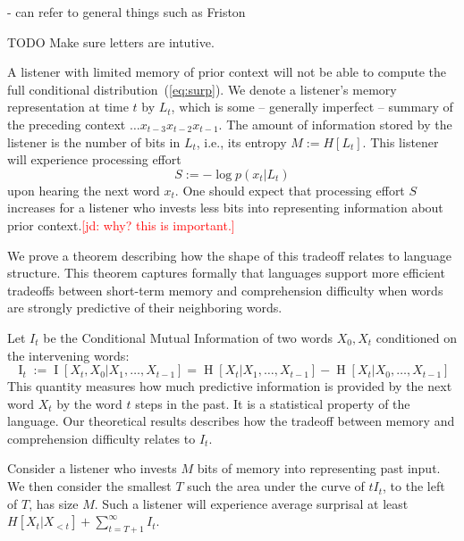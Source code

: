 \documentclass[11pt,letterpaper]{article}
\newcounter{theorem}
\newcommand{\jd}[1]{\textcolor{Red}{[jd: #1]}}
\begin{document}
- can refer to general things such as Friston


TODO Make sure letters are intutive.

A listener with limited memory of prior context will not be able to compute the full conditional distribution~(\ref{eq:surp}).
We denote a listener's memory representation at time $t$ by $L_t$, which is some -- generally imperfect -- summary of the preceding context $\dots x_{t-3}x_{t-2}x_{t-1}$.
The amount of information stored by the listener is the number of bits in $L_t$, i.e., its entropy $M := H[L_t]$.
This listener will experience processing effort
\begin{equation}
	S :=	-\log p(x_t|L_t)
\end{equation}
upon hearing the next word $x_t$.
One should expect that processing effort $S$ increases for a listener who invests less bits into representing information about prior context.\jd{why? this is important.}

We prove a theorem describing how the shape of this tradeoff relates to language structure. %
This theorem captures formally that languages support more efficient tradeoffs between short-term memory and comprehension difficulty when words are strongly predictive of their neighboring words.



Let $I_t$ be the Conditional Mutual Information of two words $X_0, X_t$ conditioned on the intervening words:
\begin{equation}
	\operatorname{I}_t := \operatorname{I}[X_t, X_0 | X_1, \dots, X_{t-1}] = \operatorname{H}[X_t|X_1, \dots, X_{t-1}] - \operatorname{H}[X_t|X_0, \dots, X_{t-1}] 
\end{equation}
This quantity measures how much predictive information is provided by the next word $X_t$ by the word $t$ steps in the past.
It is a statistical property of the language.
Our theoretical results describes how the tradeoff between memory and comprehension difficulty relates to $I_t$.

Consider a listener who invests $M$ bits of memory into representing past input.
We then consider the smallest $T$ such the area under the curve of $t I_t$, to the left of $T$, has size $M$.
Such a listener will experience average surprisal at least $H[X_t| X_{<t}] + \sum_{t=T+1}^\infty I_t$.
\end{document}
